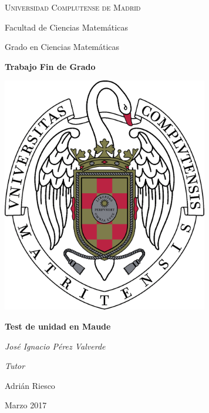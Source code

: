 \begin{titlepage}
	\centering
	{\scshape\large Universidad Complutense de Madrid \par
        Facultad de Ciencias Matemáticas \par
        Grado en Ciencias Matemáticas\par}
        \vspace{1cm}
	{\huge\bfseries Trabajo Fin de Grado\par}
        \vspace{2cm}
        {\includegraphics[width = 9cm]{ucm.pdf}}
	\vspace{3cm}

	{\huge\bfseries Test de unidad en Maude\par}
        \vspace{0.5cm}
	{\Large\itshape José Ignacio Pérez Valverde\par}
	\vfill
        {\Large\itshape Tutor\par Adri\'an Riesco\par}
	\vfill
	{\large Marzo 2017\par}
\end{titlepage}
